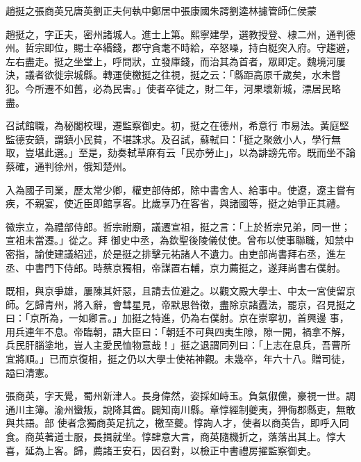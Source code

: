 
\begin{pinyinscope}

 趙挺之張商英兄唐英劉正夫何執中鄭居中張康國朱諤劉逵林攄管師仁侯蒙



 趙挺之，字正夫，密州諸城人。進士上第。熙寧建學，選教授登、棣二州，通判德州。哲宗即位，賜士卒緡錢，郡守貪耄不時給，卒怒噪，持白梃突入府。守趨避，左右盡走。挺之坐堂上，呼問狀，立發庫錢，而治其為首者，眾即定。魏境河屢決，議者欲徙宗城縣。轉運使檄挺之往視，挺之云：「縣距高原千歲矣，水未嘗犯。今所遷不如舊，必為民害。」使者卒徙之，財二年，河果壞新城，漂居民略盡。



 召試館職，為秘閣校理，遷監察御史。初，挺之在德州，希意行
 市易法。黃庭堅監德安鎮，謂鎮小民貧，不堪誅求。及召試，蘇軾曰：「挺之聚斂小人，學行無取，豈堪此選。」至是，劾奏軾草麻有云「民亦勞止」，以為誹謗先帝。既而坐不論蔡確，通判徐州，俄知楚州。



 入為國子司業，歷太常少卿，權吏部侍郎，除中書舍人、給事中。使遼，遼主嘗有疾，不親宴，使近臣即館享客。比歲享乃在客省，與諸國等，挺之始爭正其禮。



 徽宗立，為禮部侍郎。哲宗祔廟，議遷宣祖，挺之言：「上於哲宗兄弟，同一世；宣祖未當遷。」從之。拜
 御史中丞，為欽聖後陵儀仗使。曾布以使事聯職，知禁中密指，諭使建議紹述，於是挺之排擊元祐諸人不遺力。由吏部尚書拜右丞，進左丞、中書門下侍郎。時蔡京獨相，帝謀置右輔，京力薦挺之，遂拜尚書右僕射。



 既相，與京爭雄，屢陳其奸惡，且請去位避之。以觀文殿大學士、中太一宮使留京師。乞歸青州，將入辭，會彗星見，帝默思咎徵，盡除京諸蠹法，罷京，召見挺之曰：「京所為，一如卿言。」加挺之特進，仍為右僕射。京在崇寧初，首興邊
 事，用兵連年不息。帝臨朝，語大臣曰：「朝廷不可與四夷生隙，隙一開，禍拿不解，兵民肝腦塗地，豈人主愛民恤物意哉！」挺之退謂同列曰：「上志在息兵，吾曹所宜將順。」已而京復相，挺之仍以大學士使祐神觀。未幾卒，年六十八。贈司徒，謚曰清憲。



 張商英，字天覺，蜀州新津人。長身偉然，姿採如峙玉。負氣俶儻，豪視一世。調通川主簿。渝州蠻叛，說降其酋。闢知南川縣。章惇經制夔夷，狎侮郡縣吏，無敢與共語。部
 使者念獨商英足抗之，檄至夔。惇詢人才，使者以商英告，即呼入同食。商英著道士服，長揖就坐。惇肆意大言，商英隨機折之，落落出其上。惇大喜，延為上客。歸，薦諸王安石，因召對，以檢正中書禮房擢監察御史。




\end{pinyinscope}
